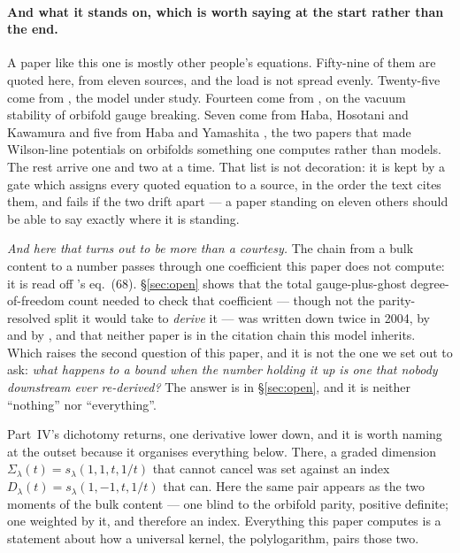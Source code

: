 \documentclass[11pt,a4paper]{article}
\begin{document}
\paragraph{And what it stands on, which is worth saying at the start rather than the end.} A paper
like this one is mostly other people's equations. Fifty-nine of them are quoted here, from eleven
sources, and the load is not spread evenly. Twenty-five come from \cite{KM25}, the model under
study. Fourteen come from \cite{CCD24}, on the vacuum stability of orbifold gauge breaking. Seven
come from Haba, Hosotani and Kawamura \cite{HHK03} and five from Haba and Yamashita \cite{HY04},
the two papers that made Wilson-line potentials on orbifolds something one computes rather than
models. The rest arrive one and two at a time. That list is not decoration: it is kept by a gate
which assigns every quoted equation to a source, in
the order the text cites them, and fails if the two drift apart --- a paper standing on eleven
others should be able to say exactly where it is standing.

\emph{And here that turns out to be more than a courtesy.} The chain from a bulk content to a
number passes through one coefficient this paper does not compute: it is read off \cite{KM25}'s
eq.~(68). \S\ref{sec:open} shows that the total gauge-plus-ghost degree-of-freedom count needed to
check that coefficient --- though not the parity-resolved split it would take to
\emph{derive} it --- was written down twice in
2004, by \cite{HY04} and by \cite{HNT}, and that neither paper is in the citation chain this model
inherits. Which raises the second question of this paper, and it is not the one we set out to ask:
\emph{what happens to a bound when the number holding it up is one that nobody downstream ever
re-derived?} The answer is in \S\ref{sec:open}, and it is neither ``nothing'' nor ``everything''.

Part~IV's dichotomy returns, one derivative lower down, and it is worth naming at the outset because
it organises everything below. There, a graded dimension $\Sigma_\lambda(t)=s_\lambda(1,1,t,1/t)$
that cannot cancel was set against an index $D_\lambda(t)=s_\lambda(1,-1,t,1/t)$ that can. Here the
same pair appears as the two moments of the bulk content --- one blind to the orbifold parity,
positive definite; one weighted by it, and therefore an index. Everything this paper computes is a
statement about how a universal kernel, the polylogarithm, pairs those two.
\end{document}
